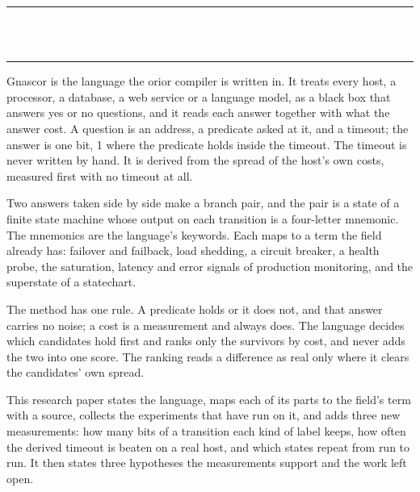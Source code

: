 \thispagestyle{empty}
\begin{center}
  \rule{\textwidth}{0.4pt}\\[0.9em]
  {\Large{}}\\[0.7em]
  \rule{\textwidth}{0.4pt}
\end{center}
\bigskip

\noindent Gnascor is the language the orior compiler is written in. It treats every host, a
processor, a database, a web service or a language model, as a black box that answers yes or no
questions, and it reads each answer together with what the answer cost. A question is an
address, a predicate asked at it, and a timeout; the answer is one bit, 1 where the predicate
holds inside the timeout. The timeout is never written by hand. It is derived from the spread
of the host's own costs, measured first with no timeout at all.

Two answers taken side by side make a branch pair, and the pair is a state of a finite state
machine whose output on each transition is a four-letter mnemonic. The mnemonics are the
language's keywords. Each maps to a term the field already has: failover and failback, load
shedding, a circuit breaker, a health probe, the saturation, latency and error signals of
production monitoring, and the superstate of a statechart.

The method has one rule. A predicate holds or it does not, and that answer carries no noise; a
cost is a measurement and always does. The language decides which candidates hold first and
ranks only the survivors by cost, and never adds the two into one score. The ranking reads a
difference as real only where it clears the candidates' own spread.

This research paper states the language, maps each of its parts to the field's term with a
source, collects the experiments that have run on it, and adds three new measurements: how
many bits of a transition each kind of label keeps, how often the derived timeout is beaten on
a real host, and which states repeat from run to run. It then states three hypotheses the
measurements support and the work left open.
\cleardoublepage

